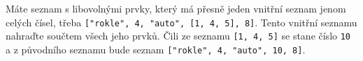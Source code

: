 \question[50]
Máte seznam s libovolnými prvky, který má přesně jeden vnitřní seznam jenom
celých čísel, třeba \texttt{["rokle", 4, "auto", [1, 4, 5], 8]}. Tento vnitřní
seznamu nahraďte součtem všech jeho prvků. Čili ze seznamu \texttt{[1, 4, 5]} se
stane číslo \texttt{10} a z původního seznamu bude seznam \texttt{["rokle", 4,
			"auto", 10, 8]}.
